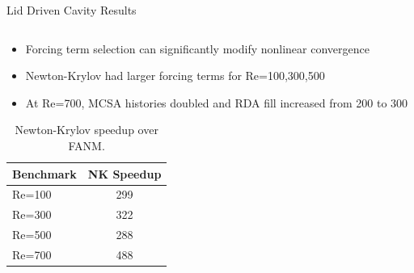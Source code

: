 \documentclass{beamer}
\begin{document}
\begin{frame}{Lid Driven Cavity Results}
\begin{columns}
    \begin{column}{0.4\textwidth}

      \small{
        \begin{itemize}
        \item Forcing term selection can significantly modify nonlinear
          convergence
        \item Newton-Krylov had larger forcing terms for Re=100,300,500
        \item At Re=700, MCSA histories doubled and RDA fill increased
          from 200 to 300
        \end{itemize}
      }

      \smallskip

      \tiny{
        \begin{table}[h!]
          \begin{center}
            \begin{tabular}{lc}\hline\hline
              \multicolumn{1}{l}{Benchmark}& 
              \multicolumn{1}{c}{NK Speedup}\\
              \hline
              Re=100 & 299 \\
              Re=300 & 322 \\
              Re=500 & 288 \\
              Re=700 & 488 \\
              \hline\hline
            \end{tabular}
          \end{center}
          \caption{Newton-Krylov speedup over FANM.}
        \end{table}
      }

    \end{column}
  \end{columns}

\end{frame}
\end{document}
